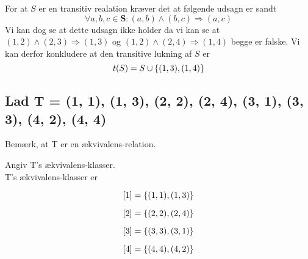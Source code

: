For at $S$ er en transitiv realation kræver det at følgende udsagn er sandt
\[\forall a,b,c \in \textbf{S} : (a,b) \wedge (b,c) \Rightarrow (a,c)\]
Vi kan dog se at dette udsagn ikke holder da vi kan se at $(1,2) \wedge (2,3) \Rightarrow (1,3)$ og $(1,2) \wedge (2,4) \Rightarrow (1,4)$ begge er falske. Vi kan derfor konkludere at den transitive lukning af $S$ er 
\[t(S) = S \cup \\\{(1,3),(1,4)\\\}\]

\subsection{Lad T = {(1, 1), (1, 3), (2, 2), (2, 4), (3, 1), (3, 3), (4, 2), (4, 4)}}
Bemærk, at T er en ækvivalens-relation.

Angiv T's ækvivalens-klasser.\\

T's ækvivalens-klasser er

\[[1] = \\\{(1,1),(1,3)\\\}\]

\[[2] = \\\{(2,2),(2,4)\\\}\]

\[[3] = \\\{(3,3),(3,1)\\\}\]

\[[4] = \\\{(4,4),(4,2)\\\}\]


